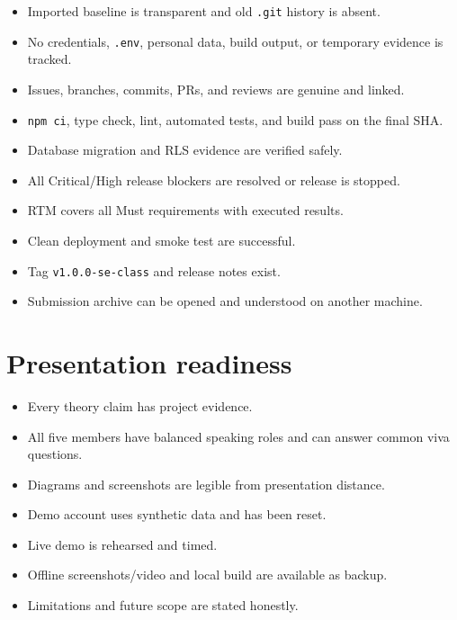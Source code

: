 \documentclass[
  10pt,
  a4paper,
  oneside]{report}
\providecommand{\tightlist}{%
  \setlength{\itemsep}{0pt}\setlength{\parskip}{0pt}}
\begin{document}
\begin{itemize}
\tightlist
\item[$\square$]
  Imported baseline is transparent and old \texttt{.git} history is
  absent.
\item[$\square$]
  No credentials, \texttt{.env}, personal data, build output, or
  temporary evidence is tracked.
\item[$\square$]
  Issues, branches, commits, PRs, and reviews are genuine and linked.
\item[$\square$]
  \texttt{npm\ ci}, type check, lint, automated tests, and build pass on
  the final SHA.
\item[$\square$]
  Database migration and RLS evidence are verified safely.
\item[$\square$]
  All Critical/High release blockers are resolved or release is stopped.
\item[$\square$]
  RTM covers all Must requirements with executed results.
\item[$\square$]
  Clean deployment and smoke test are successful.
\item[$\square$]
  Tag \texttt{v1.0.0-se-class} and release notes exist.
\item[$\square$]
  Submission archive can be opened and understood on another machine.
\end{itemize}

\section{Presentation readiness}\label{273-presentation-readiness}

\begin{itemize}
\tightlist
\item[$\square$]
  Every theory claim has project evidence.
\item[$\square$]
  All five members have balanced speaking roles and can answer common
  viva questions.
\item[$\square$]
  Diagrams and screenshots are legible from presentation distance.
\item[$\square$]
  Demo account uses synthetic data and has been reset.
\item[$\square$]
  Live demo is rehearsed and timed.
\item[$\square$]
  Offline screenshots/video and local build are available as backup.
\item[$\square$]
  Limitations and future scope are stated honestly.
\end{itemize}
\end{document}
